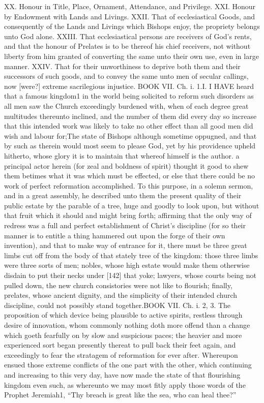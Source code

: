XX. Honour in Title, Place, Ornament, Attendance, and Privilege.
XXI. Honour by Endowment with Lands and Livings.
XXII. That of ecclesiastical Goods, and consequently of the Lands and Livings which Bishops enjoy, the propriety belongs unto God alone.
XXIII. That ecclesiastical persons are receivers of God’s rents, and that the honour of Prelates is to be thereof his chief receivers, not without liberty from him granted of converting the same unto their own use, even in large manner.
XXIV. That for their unworthiness to deprive both them and their successors of such goods, and to convey the same unto men of secular callings, now [were?] extreme sacrilegious injustice.
BOOK VII. Ch. i. 1.I. I HAVE heard that a famous kingdom1 in the world being solicited to reform such disorders as all men saw the Church exceedingly burdened with, when of each degree great multitudes thereunto inclined, and the number of them did every day so increase that this intended work was likely to take no other effect than all good men did wish and labour for;The state of Bishops although sometime oppugned, and that by such as therein would most seem to please God, yet by his providence upheld hitherto, whose glory it is to maintain that whereof himself is the author. a principal actor herein (for zeal and boldness of spirit) thought it good to shew them betimes what it was which must be effected, or else that there could be no work of perfect reformation accomplished. To this purpose, in a solemn sermon, and in a great assembly, he described unto them the present quality of their public estate by the parable of a tree, huge and goodly to look upon, but without that fruit which it should and might bring forth; affirming that the only way of redress was a full and perfect establishment of Christ’s discipline (for so their manner is to entitle a thing hammered out upon the forge of their own invention), and that to make way of entrance for it, there must be three great limbs cut off from the body of that stately tree of the kingdom: those three limbs were three sorts of men; nobles, whose high estate would make them otherwise disdain to put their necks under [142] that yoke; lawyers, whose courts being not pulled down, the new church consistories were not like to flourish; finally, prelates, whose ancient dignity, and the simplicity of their intended church discipline, could not possibly stand together.BOOK VII. Ch. i. 2, 3. The proposition of which device being plausible to active spirits, restless through desire of innovation, whom commonly nothing doth more offend than a change which goeth fearfully on by slow and suspicious paces; the heavier and more experienced sort began presently thereat to pull back their feet again, and exceedingly to fear the stratagem of reformation for ever after. Whereupon ensued those extreme conflicts of the one part with the other, which continuing and increasing to this very day, have now made the state of that flourishing kingdom even such, as whereunto we may most fitly apply those words of the Prophet Jeremiah1, “Thy breach is great like the sea, who can heal thee?”

